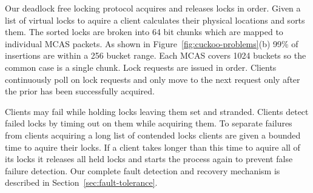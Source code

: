 
Our deadlock free locking protocol acquires and releases
locks in order.  Given a list of virtual locks to aquire a
client calculates their physical locations and sorts them.
The sorted locks are broken into 64 bit chunks which are
mapped to individual MCAS packets. As shown in
Figure~\ref{fig:cuckoo-problems}(b) 99\% of insertions are
within a 256 bucket range. Each MCAS covers 1024 buckets so
the common case is a single chunk. Lock requests are issued
in order. Clients continuously poll on lock requests and
only move to the next request only after the prior has been
successfully acquired.

Clients may fail while holding locks leaving them set and
stranded. Clients detect failed locks by timing out on them
while acquiring them. To separate failures from clients
acquiring a long list of contended locks clients are given a
bounded time to aquire their locks. If a client takes longer
than this time to aquire all of its locks it releases all
held locks and starts the process again to prevent false
failure detection. Our complete fault detection and recovery
mechanism is described in Section~\ref{sec:fault-tolerance}.



